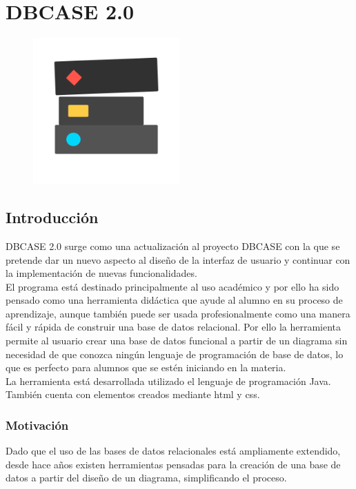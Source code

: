 \chapter{DBCASE 2.0}
\begin{figure}[H]
    \centering
    \includegraphics[width=0.5\textwidth]{img/DBCase_logo.png}
\end{figure}
\section{Introducción}
DBCASE 2.0 surge como una actualización al proyecto DBCASE con la que se pretende dar un nuevo aspecto al diseño de la interfaz de usuario y continuar con la implementación de nuevas funcionalidades.\\

El programa está destinado principalmente al uso académico y por ello ha sido pensado como una herramienta didáctica que ayude al alumno en su proceso de aprendizaje, aunque también puede ser usada profesionalmente como una manera fácil y rápida de construir una base de datos relacional. Por ello la herramienta permite al usuario crear una base de datos funcional a partir de un diagrama sin necesidad de que conozca ningún lenguaje de programación de base de datos, lo que es perfecto para alumnos que se estén iniciando en la materia.\\

La herramienta está desarrollada utilizado el lenguaje de programación Java. También cuenta con elementos creados mediante html y css.

\subsection{Motivación}
Dado que el uso de las bases de datos relacionales está ampliamente extendido, desde hace años existen herramientas pensadas para la creación de una base de datos a partir del diseño de un diagrama, simplificando el proceso.\\


